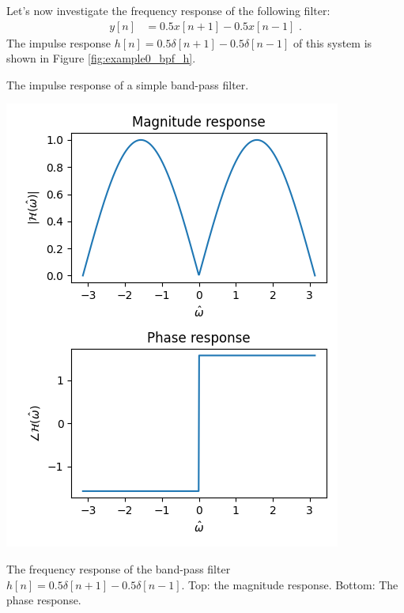 Let's now investigate the frequency response of the following filter:
\begin{align}
y[n] & = 0.5 x[n+1] - 0.5 x[n-1] \,\,.
\end{align}
The impulse response  $h[n]=0.5\delta[n+1]-0.5\delta[n-1]$ of this system is shown in Figure \ref{fig:example0_bpf_h}.
\begin{marginfigure}
\begin{center}
\end{center}
\caption{The impulse response of a simple band-pass filter.}
\label{fig:example0_bpf_h}
\end{marginfigure}

\begin{marginfigure}
\begin{center}
\includegraphics[width=\textwidth]{code/019_frequency_response/bpf_fresp.png}
\end{center}
\caption{The frequency response of the band-pass filter $h[n]=0.5\delta[n+1]-0.5\delta[n-1]$. Top: the magnitude response. Bottom: The phase response.}
\label{fig:example_bpf_fresp}
\end{marginfigure}

